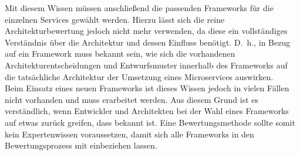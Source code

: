 Mit diesem Wissen müssen anschließend die passenden Frameworks für die einzelnen Services gewählt werden. Hierzu lässt sich die reine Architekturbewertung jedoch nicht mehr verwenden, da diese ein vollständiges Verständnis über die Architektur und dessen Einfluss benötigt. D.~h., in Bezug auf ein Framework muss bekannt sein, wie sich die vorhandenen Architekturentscheidungen und Entwurfsmuster innerhalb des Frameworks auf die tatsächliche Architektur der Umsetzung eines Microservices auswirken.\\
Beim Einsatz eines neuen Frameworks ist dieses Wissen jedoch in vielen Fällen nicht vorhanden und muss erarbeitet werden. Aus diesem Grund ist es verständlich, wenn Entwickler und Architekten bei der Wahl eines Frameworks auf etwas zurück greifen, dass bekannt ist. Eine Bewertungsmethode sollte somit kein Expertenwissen voraussetzen, damit sich alle Frameworks in den Bewertungsprozess mit einbeziehen lassen.




